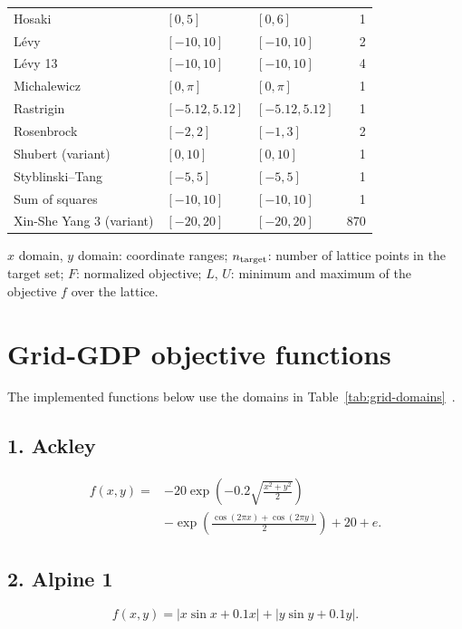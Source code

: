 \begin{table}[htbp]
\begin{threeparttable}
\begin{tabular}{@{}lllr@{}}
Hosaki & \([0,5]\) & \([0,6]\) & 1\\
L\'evy & \([-10,10]\) & \([-10,10]\) & 2\\
L\'evy 13 & \([-10,10]\) & \([-10,10]\) & 4\\
Michalewicz & \([0,\pi]\) & \([0,\pi]\) & 1\\
Rastrigin & \([-5.12,5.12]\) & \([-5.12,5.12]\) & 1\\
Rosenbrock & \([-2,2]\) & \([-1,3]\) & 2\\
Shubert (variant) & \([0,10]\) & \([0,10]\) & 1\\
Styblinski--Tang & \([-5,5]\) & \([-5,5]\) & 1\\
Sum of squares & \([-10,10]\) & \([-10,10]\) & 1\\
Xin-She Yang 3 (variant) & \([-20,20]\) & \([-20,20]\) & 870\\\bottomrule
\end{tabular}
\begin{tablenotes}[flushleft]\footnotesize
\item \(x\) domain, \(y\) domain: coordinate ranges; \(n_{\rm target}\): number of lattice points in the target set; \(F\): normalized objective; \(L\), \(U\): minimum and maximum of the objective \(f\) over the lattice.
\end{tablenotes}
\end{threeparttable}
\end{table}

\FloatBarrier %
\section{Grid-GDP objective functions}\label{sec:supp-objectives}
The implemented functions below use the domains in Table~\ref{tab:grid-domains}~\citep{rbfoptTestArchive}.

\subsection*{1. Ackley}
\begin{equation}\label{eq:supp-ackley}
\begin{aligned}
f(x,y)={}&-20\exp\!\left(-0.2\sqrt{\frac{x^2+y^2}{2}}\right)\\
&-\exp\!\left(\frac{\cos(2\pi x)+\cos(2\pi y)}{2}\right)+20+e.
\end{aligned}
\end{equation}

\subsection*{2. Alpine 1}
\begin{equation}\label{eq:supp-alpine1}
f(x,y)=|x\sin x+0.1x|+|y\sin y+0.1y|.
\end{equation}

